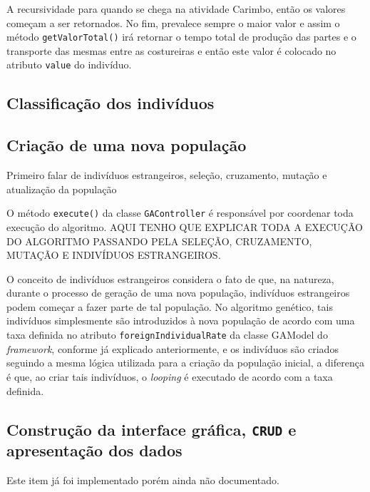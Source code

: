 A recursividade para quando se chega na atividade Carimbo, então os valores começam a ser retornados.  No fim, prevalece sempre o 
maior valor e assim o método \texttt{getValorTotal()} irá retornar o tempo total de produção das partes e o transporte das mesmas 
entre as costureiras e então este valor é colocado no atributo \texttt{value} do indivíduo.

\subsection{Classificação dos indivíduos}

\subsection{Criação de uma nova população}
  Primeiro falar de indivíduos estrangeiros, seleção, cruzamento, mutação e atualização da população

\par O método \texttt{execute()} da classe \texttt{GAController} é responsável por coordenar toda execução do algoritmo.
     AQUI TENHO QUE EXPLICAR TODA A EXECUÇÃO DO ALGORITMO PASSANDO PELA SELEÇÃO, CRUZAMENTO, MUTAÇÃO E INDIVÍDUOS ESTRANGEIROS.

\par O conceito de indivíduos estrangeiros considera o fato de que, na natureza, durante o processo de geração de uma nova população, indivíduos estrangeiros podem começar a fazer parte de tal população. No algoritmo genético, tais indivíduos simplesmente são introduzidos
à nova população de acordo com uma taxa definida no atributo \texttt{foreignIndividualRate} da classe GAModel do \textit{framework}, 
conforme já explicado anteriormente, e os indivíduos são criados seguindo a mesma lógica utilizada para a criação da população inicial, 
a diferença é que, ao criar tais indivíduos, o \textit{looping} é executado de acordo com a taxa definida.


 
\subsection{Construção da interface gráfica, \texttt{CRUD} e apresentação dos dados} 
\par Este item já foi implementado porém ainda não documentado. 



